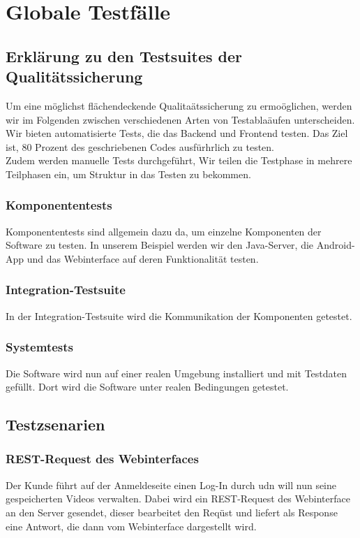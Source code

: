 \chapter{Globale Testf\"alle}
\section{Erkl\"arung zu den Testsuites der Qualit\"atssicherung}
Um eine m\"oglichst fl\"achendeckende Qualita\"atssicherung zu ermo\"oglichen, werden wir im Folgenden zwischen verschiedenen Arten von Testabla\"aufen unterscheiden. Wir bieten automatisierte Tests, die das Backend und Frontend testen. Das Ziel ist, 80 Prozent des geschriebenen Codes ausf\"urhrlich zu testen. \\
Zudem werden manuelle Tests durchgef\"uhrt, 
Wir teilen die Testphase in mehrere Teilphasen ein, um Struktur in das Testen zu bekommen.
\subsection{Komponententests}
Komponententests sind allgemein dazu da, um einzelne Komponenten der Software zu testen. In unserem Beispiel werden wir den Java-Server, die Android-App und das Webinterface auf deren Funktionalit\"at testen. 
\subsection{Integration-Testsuite}
In der Integration-Testsuite wird die Kommunikation der Komponenten getestet.
\subsection{Systemtests}
Die Software wird nun auf einer realen Umgebung installiert und mit Testdaten gef\"ullt. Dort wird die Software unter realen Bedingungen getestet.

\section{Testzsenarien}
\subsection{REST-Request des Webinterfaces}
Der Kunde f\"uhrt auf der Anmeldeseite einen Log-In durch udn will nun seine gespeicherten Videos verwalten. Dabei wird ein REST-Request des Webinterface an den Server gesendet, dieser bearbeitet den Req\"ust und liefert als Response eine Antwort, die dann vom Webinterface dargestellt wird.

